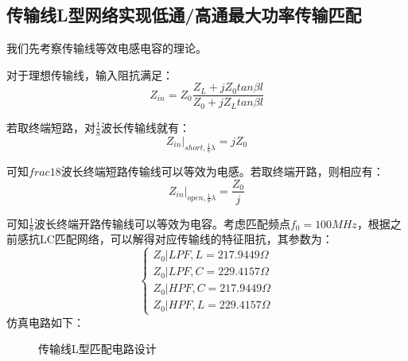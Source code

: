 \documentclass[12pt, a4paper]{article}
\begin{document}
    \subsection{传输线L型网络实现低通/高通最大功率传输匹配}
    我们先考察传输线等效电感电容的理论。\par
    对于理想传输线，输入阻抗满足：
    \begin{equation}
    	Z_{in} = Z_0 \frac{Z_L + j Z_0 tan \beta l}{Z_0 + j Z_L tan \beta l}
    \end{equation}\par
    若取终端短路，对$\frac{1}{8}$波长传输线就有：
    \begin{equation}
    	Z_{in}|_{short, \frac{1}{8}\lambda} = jZ_0 
    \end{equation}\par
    可知$frac{1}{8}$波长终端短路传输线可以等效为电感。若取终端开路，则相应有：
    \begin{equation}
    	Z_{in}|_{open, \frac{1}{8}\lambda} = \frac{Z_0}{j} 
    \end{equation}\par
    可知$\frac{1}{8}$波长终端开路传输线可以等效为电容。考虑匹配频点$f_0 = 100MHz$，根据之前感抗LC匹配网络，可以解得对应传输线的特征阻抗，其参数为：
    $$
    \begin{cases}
    	Z_0|{LPF, L} = 217.9449 \Omega \\
    	Z_0|{LPF, C} = 229.4157 \Omega \\
    	Z_0|{HPF, C} = 217.9449 \Omega \\
    	Z_0| {HPF, L} = 229.4157 \Omega
    \end{cases}
    $$
    仿真电路如下：
     \begin{figure}[H]
    	\centering
    	
    	\centering
    	\caption{传输线L型匹配电路设计}
    \end{figure}
\end{document}
